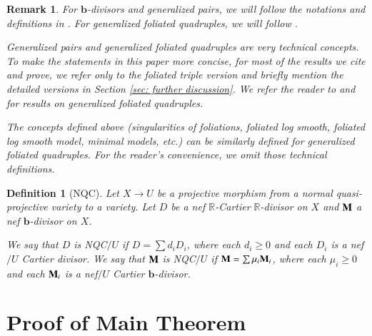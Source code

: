 \documentclass[preprint,12pt]{elsarticle}
\newcommand{\bb}{\bm{b}}
\newcommand{\Mm}{{\bf{M}}}
\newcommand{\Rr}{\mathbb{R}}
\newtheorem{defn}[thm]{Definition}
\newtheorem{rem}[thm]{Remark}
\begin{document}
\begin{rem}
For $\bb$-divisors and generalized pairs, we will follow the notations and definitions in \cite{BZ16, HL23}. For generalized foliated quadruples, we will follow \cite{CHLX23}.

Generalized pairs and generalized foliated quadruples are very technical concepts. To make the statements in this paper more concise, for most of the results we cite and prove, we refer only to the foliated triple version and briefly mention the detailed versions in Section \ref{sec: further discussion}. We refer the reader to \cite[Appendix A]{LMX24b} and \cite{CHLX23} for results on generalized foliated quadruples.

The concepts defined above (singularities of foliations, foliated log smooth, foliated log smooth model, minimal models, etc.) can be similarly defined for generalized foliated quadruples. For the reader's convenience, we omit those technical definitions.
\end{rem}

\begin{defn}[NQC]
    Let $X\rightarrow U$ be a projective morphism from a normal quasi-projective variety to a variety. Let $D$ be a nef $\Rr$-Cartier $\Rr$-divisor on $X$ and $\Mm$ a nef $\bb$-divisor on $X$.

    We say that $D$ is NQC$/U$ if $D=\sum d_iD_i$, where each $d_i\geq 0$ and each $D_i$ is a nef$/U$ Cartier divisor. We say that $\Mm$ is NQC$/U$ if $\Mm=\sum \mu_i\Mm_i$, where each $\mu_i\geq 0$ and each $\Mm_i$ is a nef$/U$ Cartier $\bb$-divisor.
\end{defn}



\section{Proof of Main Theorem}\label{sec: proof}
\end{document}
